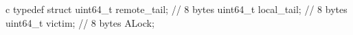 c
typedef struct {
    uint64_t remote_tail;   // 8 bytes
    uint64_t local_tail;    // 8 bytes
    uint64_t victim;        // 8 bytes
} ALock;